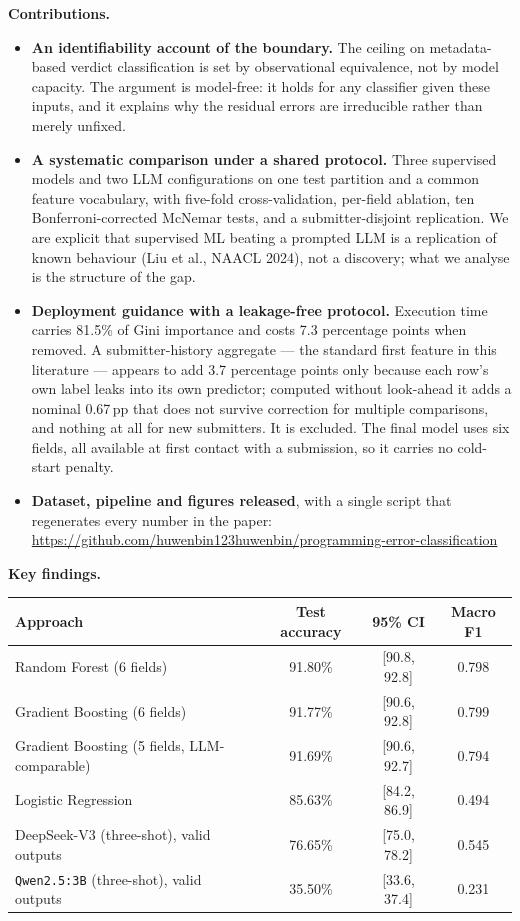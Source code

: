 \documentclass[11pt]{article}
\begin{document}
\noindent\textbf{Contributions.}
\begin{itemize}\setlength\itemsep{0.4em}
\item \textbf{An identifiability account of the boundary.} The ceiling on metadata-based verdict classification is set by observational equivalence, not by model capacity. The argument is model-free: it holds for any classifier given these inputs, and it explains why the residual errors are irreducible rather than merely unfixed.
\item \textbf{A systematic comparison under a shared protocol.} Three supervised models and two LLM configurations on one test partition and a common feature vocabulary, with five-fold cross-validation, per-field ablation, ten Bonferroni-corrected McNemar tests, and a submitter-disjoint replication. We are explicit that supervised ML beating a prompted LLM is a replication of known behaviour (Liu et al., NAACL 2024), not a discovery; what we analyse is the structure of the gap.
\item \textbf{Deployment guidance with a leakage-free protocol.} Execution time carries 81.5\% of Gini importance and costs 7.3 percentage points when removed. A submitter-history aggregate --- the standard first feature in this literature --- appears to add 3.7 percentage points only because each row's own label leaks into its own predictor; computed without look-ahead it adds a nominal 0.67\,pp that does not survive correction for multiple comparisons, and nothing at all for new submitters. It is excluded. The final model uses six fields, all available at first contact with a submission, so it carries no cold-start penalty.
\item \textbf{Dataset, pipeline and figures released}, with a single script that regenerates every number in the paper: \url{https://github.com/huwenbin123huwenbin/programming-error-classification}
\end{itemize}

\noindent\textbf{Key findings.}
\begin{center}
\small
\begin{tabular}{@{}lccc@{}}
\toprule
Approach & Test accuracy & 95\% CI & Macro F1 \\
\midrule
Random Forest (6 fields) & 91.80\% & [90.8, 92.8] & 0.798 \\
Gradient Boosting (6 fields) & 91.77\% & [90.6, 92.8] & 0.799 \\
Gradient Boosting (5 fields, LLM-comparable) & 91.69\% & [90.6, 92.7] & 0.794 \\
Logistic Regression & 85.63\% & [84.2, 86.9] & 0.494 \\
DeepSeek-V3 (three-shot), valid outputs & 76.65\% & [75.0, 78.2] & 0.545 \\
\texttt{Qwen2.5:3B} (three-shot), valid outputs & 35.50\% & [33.6, 37.4] & 0.231 \\
\bottomrule
\end{tabular}
\end{center}
\end{document}
